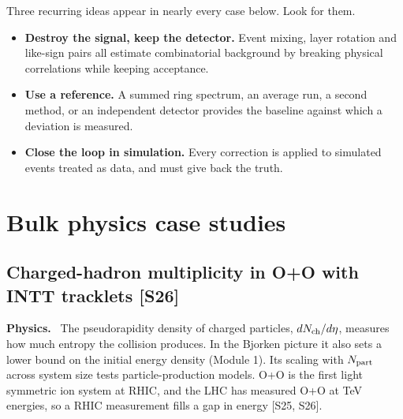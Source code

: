 \documentclass[11pt,letterpaper]{article}
\newcommand{\hd}[1]{\par\smallskip\noindent\textbf{\color{blue!50!black}#1.}\ }
\begin{document}
Three recurring ideas appear in nearly every case below. Look for them.
\begin{itemize}
\item \textbf{Destroy the signal, keep the detector.} Event mixing, layer rotation and like-sign pairs all estimate combinatorial
background by breaking physical correlations while keeping acceptance.
\item \textbf{Use a reference.} A summed ring spectrum, an average run, a second method, or an independent detector provides the
baseline against which a deviation is measured.
\item \textbf{Close the loop in simulation.} Every correction is applied to simulated events treated as data, and must give back the
truth.
\end{itemize}

\section{Bulk physics case studies}
\subsection{Charged-hadron multiplicity in O+O with INTT tracklets [S26]}
\hd{Physics} The pseudorapidity density of charged particles, $dN_{\rm ch}/d\eta$, measures how much entropy the collision produces.
In the Bjorken picture it also sets a lower bound on the initial energy density (Module 1). Its scaling with $N_{\rm part}$ across
system size tests particle-production models. O+O is the first light symmetric ion system at RHIC, and the LHC has measured O+O at
TeV energies, so a RHIC measurement fills a gap in energy [S25, S26].
\end{document}
